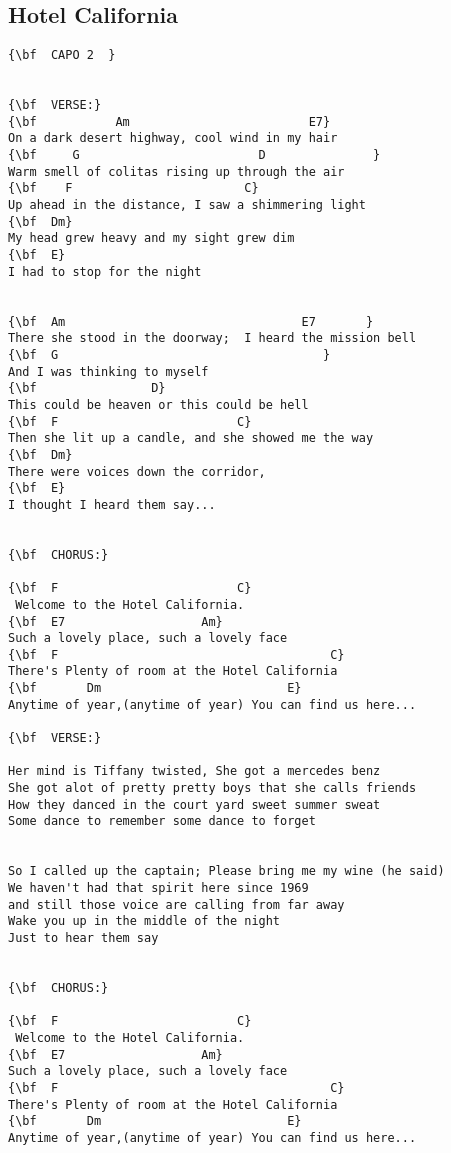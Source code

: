 \documentclass[a4paper]{article}
\begin{document}
\subsection{Hotel California}
\begin{Verbatim}[commandchars=\\\{\}]
{\bf  CAPO 2  }


{\bf  VERSE:}
{\bf           Am                         E7}
On a dark desert highway, cool wind in my hair
{\bf     G                         D               }
Warm smell of colitas rising up through the air
{\bf    F                        C}
Up ahead in the distance, I saw a shimmering light
{\bf  Dm}
My head grew heavy and my sight grew dim
{\bf  E}
I had to stop for the night


{\bf  Am                                 E7       }
There she stood in the doorway;  I heard the mission bell
{\bf  G                                     }
And I was thinking to myself 
{\bf                D}
This could be heaven or this could be hell
{\bf  F                         C}
Then she lit up a candle, and she showed me the way
{\bf  Dm}
There were voices down the corridor, 
{\bf  E}
I thought I heard them say...


{\bf  CHORUS:}

{\bf  F                         C}
 Welcome to the Hotel California.
{\bf  E7                   Am}
Such a lovely place, such a lovely face
{\bf  F                                      C}
There's Plenty of room at the Hotel California
{\bf       Dm                          E}
Anytime of year,(anytime of year) You can find us here...

{\bf  VERSE:}

Her mind is Tiffany twisted, She got a mercedes benz
She got alot of pretty pretty boys that she calls friends
How they danced in the court yard sweet summer sweat
Some dance to remember some dance to forget


So I called up the captain; Please bring me my wine (he said)
We haven't had that spirit here since 1969
and still those voice are calling from far away
Wake you up in the middle of the night 
Just to hear them say


{\bf  CHORUS:}

{\bf  F                         C}
 Welcome to the Hotel California.
{\bf  E7                   Am}
Such a lovely place, such a lovely face
{\bf  F                                      C}
There's Plenty of room at the Hotel California
{\bf       Dm                          E}
Anytime of year,(anytime of year) You can find us here...


\end{Verbatim}
\end{document}
